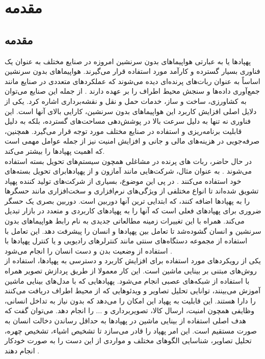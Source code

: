 \chapter{مقدمه}
\section{مقدمه}
پهپاد‌ها یا به عبارتی هواپیماهای بدون سرنشین امروزه در صنایع مختلف به عنوان یک فناوری
 ‌بسیار گسترده و کارآمد مورد استفاده قرار می‌گیرند. هواپیماهای بدون سرنشین اساساً به عنوان ربات‌های پرنده‌ای
 دیده می‌شوند که عملکردهای متعددی در صنایع مانند جمع‌آوری داده‌ها و سنجش محیط اطراف را بر عهده دارند \cite{waltergesture}.
 از جمله این صنایع می‌توان به کشاورزی، ساخت و ساز، خدمات حمل و نقل و نقشه‌برداری اشاره کرد. یکی از دلایل
 اصلی افزایش کاربرد این هواپیما‌های بدون سرنشین، کارایی بالای آنها است. این فناوری نه تنها به دلیل سرعت بالا در پوشش‌دهی
 مساحت‌های گسترده، بلکه به دلیل قابلیت برنامه‌ریزی و استفاده در صنایع مختلف مورد توجه قرار می‌گیرد.
 همچنین، صرفه‌جویی در هزینه‌های مالی و جانی و افزایش امنیت نیز از جمله عوامل مهمی است که اهمیت پهپادها را بیشتر می‌کند\cite{puri2017agriculture}.
 \\
 در حال حاضر، ربات های پرنده در مشاغلی همچون سیستم‌های تحویل بسته استفاده می‌شوند \cite{gatteschi2015new}. به عنوان مثال، شرکت‌هایی مانند آمازون و 
  از پهپادهابرای تحویل بسته‌های خود استفاده می‌کنند \cite{moore2014nypd}. 
 در پی این موضوع، بسیاری از شرکت‌های تولید کننده
  پهپاد تشویق شده‌اند تا انواع مختلفی از ویژگی‌های نرم‌افزاری و سخت‌افزاری
 مانند حسگرها را به پهپاد‌ها اضافه کنند، که ابتدایی ترین
  آنها دوربین است. دوربین بصری یک حسگر ضروری برای پهپادهای فعلی
  است که آنها را به پهپادهای کاربردی و متعدد در بازار تبدیل می‌کند\cite{natarajan2018hand}. همراه با این تغییرات زمینه مطالعاتی جدیدی به نام رابط هواپیماهای بدون سرنشین و
   انسان گشوده‌شد تا تعامل بین پهپاد‌ها و 
 انسان را پیشرفت دهد. این تعامل با استفاده از مجموعه‌ دستگاه‌های سنتی مانند کنترلر‌های رادیویی و یا کنترل پهپادها با استفاده از وضعیت بدن و دست انسان را انجام می‌شود \cite{hadri2018hand}.
 \\
 یکی از رویکردهای مورد استفاده برای افزایش کاربرد و دسترسی به پهپادها، استفاده از روش‌های مبتنی بر بینایی ماشین است. این کار معمولا از طریق پردازش تصویر
 همراه با استفاده از شبکه‌های عصبی
 انجام می‌شود. پهپاد‌هایی که با مدل‌های بینایی ماشین آموزش می‌بینند، توانایی تحلیل تصاویر و ویدئو‌هایی که از محیط اطراف
 دریافت می‌کنند را دارا هستند. این قابلیت به پهپاد این امکان را می‌دهد که بدون نیاز به تداخل انسانی، وظایفی همچون امنیت، ارسال کالا، تصویر‌برداری و ... را انجام دهد\cite{zhu2018vision}.
 می‌توان گفت که هدف اصلی استفاده از بینایی ماشین در پهپاد‌ها به حداقل رساندن دخالت انسان به صورت مستقیم است. این
 امر پهپاد را قادر می‌سازد تا تشخیص اشیاء، تشخیص چهره، تحلیل تصاویر، شناسایی الگوهای مختلف و مواردی از این دست را به صورت خودکار انجام دهند \cite{guvenc2018detection}.

